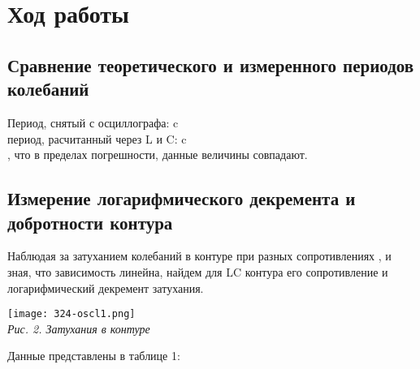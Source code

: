 

\section{Ход работы}

\subsection{Сравнение теоретического и измеренного периодов колебаний}

Период, снятый с осциллографа: c \\ [0.2cm]

 период, расчитанный через L и C: c \\ [0.2cm]

, что в пределах погрешности, данные величины совпадают. \\ [0.2cm]

\subsection{Измерение логарифмического декремента и добротности контура}

Наблюдая за затуханием колебаний в контуре при разных сопротивлениях , и зная, что зависимость  линейна, найдем для LC контура его сопротивление и логарифмический декремент затухания. 

\begin{center}

    \texttt{[image: 324-oscl1.png]} \\
    \textit{Рис. 2. Затухания в контуре}

\end{center}

Данные представлены в таблице 1:



